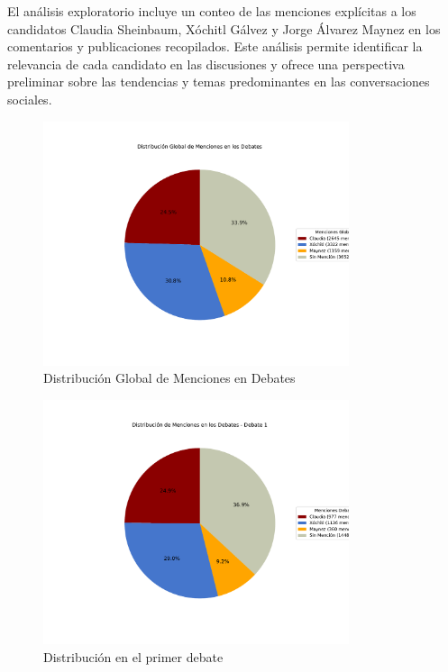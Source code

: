 \documentclass[10pt, a4paper]{article}
\begin{document}
	El análisis exploratorio incluye un conteo de las menciones explícitas a los candidatos Claudia Sheinbaum, Xóchitl Gálvez y Jorge Álvarez Maynez en los comentarios y publicaciones recopilados. Este análisis permite identificar la relevancia de cada candidato en las discusiones y ofrece una perspectiva preliminar sobre las tendencias y temas predominantes en las conversaciones sociales.
	
	\begin{figure}[h!]
		\centering
		\includegraphics[width=0.8\textwidth]{grafica_global_debates.pdf} %
		\vspace{-15mm}
		\caption{Distribución Global de Menciones en Debates}
		\label{fig:globalDebates} %
	\end{figure}
	
	
	\begin{figure}[h!]
		\centering
		\includegraphics[width=0.8\textwidth]{grafica_debate1.pdf} %
		\vspace{-15mm}
		\caption{Distribución en el primer debate}
		\label{fig:distrDebate1} %
	\end{figure}
	
\end{document}
